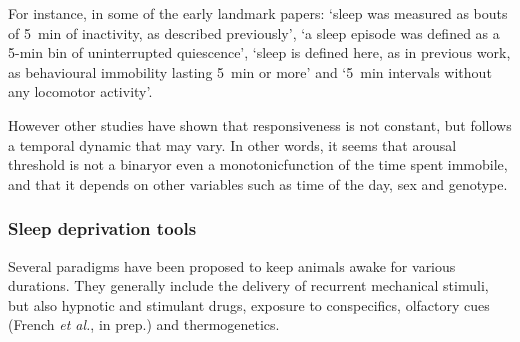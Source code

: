 For instance, in some of the early landmark papers:
`sleep was measured as bouts of 5~min of inactivity, as described previously'\cite{joiner_sleep_2006}, %
`a sleep episode was defined as a 5-min bin of uninterrupted quiescence'\cite{pitman_dynamic_2006},
`sleep is defined here, as in previous work, as behavioural immobility lasting 5~min or more'\cite{cirelli_reduced_2005} and
`5~min intervals without any locomotor activity'\cite{kume_dopamine_2005}.

However other studies have shown that responsiveness is not constant, but follows a temporal dynamic that may vary. 
In other words, it seems that arousal threshold is not a binary\emd{}or even a monotonic\emd{}function of the time spent immobile,
and that it depends on other variables such as time of the day, sex and genotype\cite{van_alphen_dynamic_2013,faville_how_2015}.


\subsubsection{Sleep deprivation tools}
\label{sec:sleep-dep-tools}
Several paradigms have been proposed to keep animals awake for various durations.
They generally include the delivery of recurrent mechanical stimuli\cite{shaw_stress_2002, huber_sleep_2004,sauer_sleep_2004,li_sleep_2009,linford_re-patterning_2012, faville_how_2015}, but also
hypnotic and stimulant drugs\cite{hendricks_modafinil_2003,andretic_dopaminergic_2005},
exposure to conspecifics\cite{gilestro_widespread_2009,beckwith_regulation_2017}, 
olfactory cues (French \emph{et al.}, in prep.) and
thermogenetics\cite{seidner_identification_2015,dubowy_genetic_2016}.




